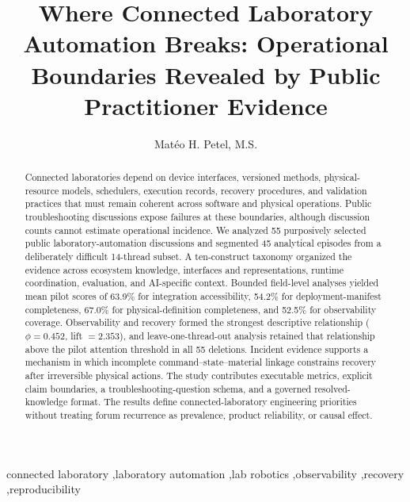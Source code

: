 \documentclass[preprint,12pt]{elsarticle}
\begin{document}
\begin{frontmatter}

\title{Where Connected Laboratory Automation Breaks: Operational Boundaries Revealed by Public Practitioner Evidence}

\author[csrct,sentinelops]{Mat\'eo H. Petel, M.S.}

\begin{abstract}
Connected laboratories depend on device interfaces, versioned methods, physical-resource models, schedulers, execution records, recovery procedures, and validation practices that must remain coherent across software and physical operations. Public troubleshooting discussions expose failures at these boundaries, although discussion counts cannot estimate operational incidence. We analyzed 55 purposively selected public laboratory-automation discussions and segmented 45 analytical episodes from a deliberately difficult 14-thread subset. A ten-construct taxonomy organized the evidence across ecosystem knowledge, interfaces and representations, runtime coordination, evaluation, and AI-specific context. Bounded field-level analyses yielded mean pilot scores of 63.9\% for integration accessibility, 54.2\% for deployment-manifest completeness, 67.0\% for physical-definition completeness, and 52.5\% for observability coverage. Observability and recovery formed the strongest descriptive relationship ($\phi=0.452$, lift $=2.353$), and leave-one-thread-out analysis retained that relationship above the pilot attention threshold in all 55 deletions. Incident evidence supports a mechanism in which incomplete command--state--material linkage constrains recovery after irreversible physical actions. The study contributes executable metrics, explicit claim boundaries, a troubleshooting-question schema, and a governed resolved-knowledge format. The results define connected-laboratory engineering priorities without treating forum recurrence as prevalence, product reliability, or causal effect.
\end{abstract}

\begin{keyword}
connected laboratory \sep laboratory automation \sep lab robotics \sep observability \sep recovery \sep reproducibility
\end{keyword}
\end{frontmatter}

\linenumbers












\end{document}
